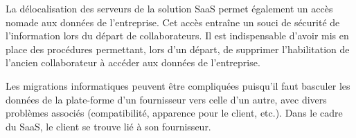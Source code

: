 La délocalisation des serveurs de la solution SaaS permet également un accès nomade aux données de l'entreprise. Cet accès entraîne un souci de sécurité de l'information lors du départ de collaborateurs. Il est indispensable d'avoir mis en place des procédures permettant, lors d'un départ, de supprimer l'habilitation de l'ancien collaborateur à accéder aux données de l'entreprise.
\medskip

Les migrations informatiques peuvent être compliquées puisqu'il faut basculer les données de la plate-forme d'un fournisseur vers celle d'un autre, avec divers problèmes associés (compatibilité, apparence pour le client, etc.). Dans le cadre du SaaS, le client se trouve lié à son fournisseur.
